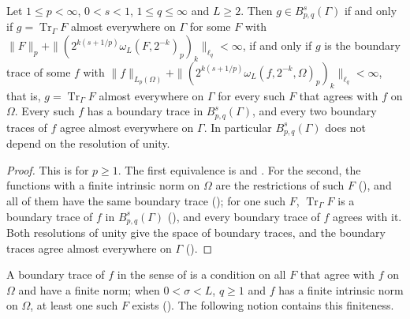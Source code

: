\begin{theorem}
\label{thm:boundary-trace-space}
\leanok
{}
Let $1 \leq p < \infty$, $0 < s < 1$, $1 \leq q \leq \infty$ and $L \geq 2$. Then
$g \in B^s_{p,q}(\Gamma)$ if and only if $g = \operatorname{Tr}_\Gamma F$ almost everywhere on $\Gamma$
for some $F$ with $\|F\|_p + \|(2^{k(s + 1/p)} \omega_L(F, 2^{-k})_p)_k\|_{\ell_q} < \infty$, if and
only if $g$ is the boundary trace of some $f$ with
$\|f\|_{L_p(\Omega)} + \|(2^{k(s + 1/p)} \omega_L(f, 2^{-k}, \Omega)_p)_k\|_{\ell_q} < \infty$, that
is, $g = \operatorname{Tr}_\Gamma F$ almost everywhere on $\Gamma$ for every such $F$ that agrees with
$f$ on $\Omega$. Every such $f$ has a boundary trace in $B^s_{p,q}(\Gamma)$, and every two
boundary traces of $f$ agree almost everywhere on $\Gamma$. In particular $B^s_{p,q}(\Gamma)$ does
not depend on the resolution of unity.
\end{theorem}

\begin{proof}
\leanok
This is \cite[Theorem 4.11]{SchneiderVybiral} for $p \geq 1$. The first equivalence is
 and . For the second, the
functions with a finite intrinsic norm on $\Omega$ are the restrictions of such $F$
(), and all of them have the same boundary trace
(); for one such $F$, $\operatorname{Tr}_\Gamma F$ is a boundary
trace of $f$ in $B^s_{p,q}(\Gamma)$ (), and every boundary trace
of $f$ agrees with it. Both resolutions of unity give the space of boundary traces,
and the boundary traces agree almost everywhere on $\Gamma$ ().
\end{proof}

A boundary trace of $f$ in the sense of  is a condition on all
$F$ that agree with $f$ on $\Omega$ and have a finite norm; when $0 < \sigma < L$, $q \geq 1$ and
$f$ has a finite intrinsic norm on $\Omega$, at least one such $F$ exists
(). The following notion contains this finiteness.

